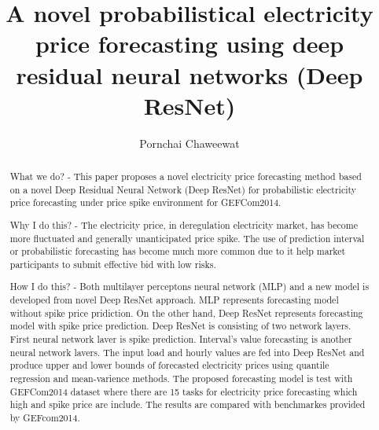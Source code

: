\documentclass[review]{elsarticle}
\begin{document}
\begin{frontmatter}

\title{A novel probabilistical electricity price forecasting using deep residual neural networks (Deep ResNet)}

\author{Pornchai Chaweewat}

\address{AIT}

%
%

\begin{abstract}
What we do? - This paper proposes a novel electricity price forecasting method based on a novel Deep Residual Neural Network (Deep ResNet) for probabilistic electricity price forecasting under price spike environment for GEFCom2014.

Why I do this? - The electricity price, in deregulation electricity market, has become more fluctuated and generally unanticipated price spike. The use of prediction interval or probabilistic forecasting has become much more common due to it help market participants to submit effective bid with low risks.

How I do this? - Both multilayer perceptons neural network (MLP) and a new model is developed from novel Deep ResNet approach. MLP represents forecasting model without spike price pridiction. On the other hand, Deep ResNet represents forecasting model with spike price prediction. Deep ResNet is consisting of two network layers. First neural network laver is spike prediction. Interval's value forecasting is another neural network lavers. The input load and hourly values are fed into Deep ResNet and produce upper and lower bounds of forecasted electricity prices using quantile regression and mean-varience methods. The proposed forecasting model is test with GEFCom2014 dataset where there are 15 tasks for electricity price forecasting which high and spike price are include. The results are compared with benchmarkes provided by GEFcom2014.


\end{abstract}
\end{frontmatter}
\end{document}
